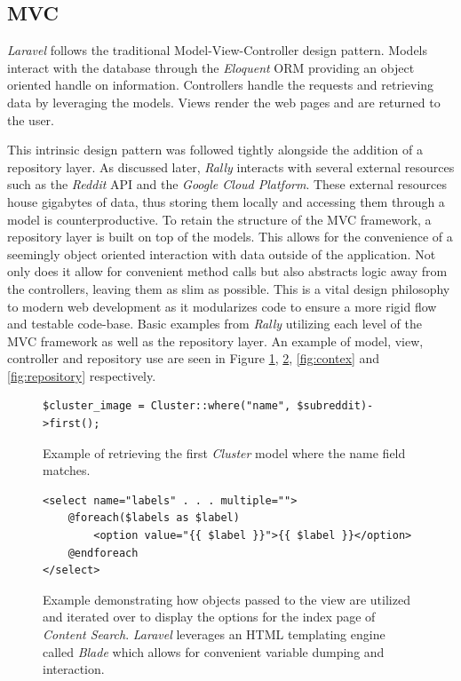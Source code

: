 \documentclass[msc,oneside]{ubcthesis}%
\begin{document}
\subsection{MVC}
\textit{Laravel} follows the traditional Model-View-Controller design pattern. Models interact with the database through the \textit{Eloquent} ORM providing an object oriented handle on information. Controllers handle the requests and retrieving data by leveraging the models. Views render the web pages and are returned to the user.
\par
This intrinsic design pattern was followed tightly alongside the addition of a repository layer. As discussed later, \textit{Rally} interacts with several external resources such as the \textit{Reddit} API and the \textit{Google Cloud Platform}. These external resources house gigabytes of data, thus storing them locally and accessing them through a model is counterproductive. To retain the structure of the MVC framework, a repository layer is built on top of the models. This allows for the convenience of a seemingly object oriented interaction with data outside of the application. Not only does it allow for convenient method calls but also abstracts logic away from the controllers, leaving them as slim as possible. This is a vital design philosophy to modern web development as it modularizes code to ensure a more rigid flow and testable code-base. Basic examples from \textit{Rally} utilizing each level of the MVC framework as well as the repository layer. An example of model, view, controller and repository use are seen in Figure \ref{fig:modelex}, \ref{fig:viewex}, \ref{fig:contex} and \ref{fig:repository} respectively.
\par
\begin{figure}[H]
\begin{center}
\begin{lstlisting}
$cluster_image = Cluster::where("name", $subreddit)->first();
\end{lstlisting}
\end{center}
\caption[Example of Model]{
Example of retrieving the first \textit{Cluster} model where the name field matches.}
\label{fig:modelex}
\end{figure}

\begin{figure}[H]
\begin{lstlisting}
<select name="labels" . . . multiple="">
	@foreach($labels as $label)
		<option value="{{ $label }}">{{ $label }}</option>
	@endforeach
</select>
\end{lstlisting}
\caption[Example of View]{
Example demonstrating how objects passed to the view are utilized and iterated over to display the options for the index page of \textit{Content Search}. \textit{Laravel} leverages an HTML templating engine called \textit{Blade} which allows for convenient variable dumping and interaction.}
\label{fig:viewex}
\end{figure}
\end{document}
